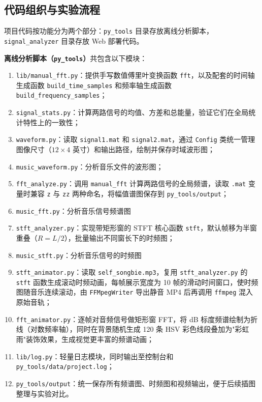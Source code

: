\documentclass[12pt,a4paper,UTF8]{ctexart}
\begin{document}
\subsection{代码组织与实验流程}
项目代码按功能分为两个部分：\texttt{py\_tools} 目录存放离线分析脚本，\texttt{signal\_analyzer} 目录存放 Web 部署代码。

\textbf{离线分析脚本（\texttt{py\_tools}）}共包含以下模块：
\begin{enumerate}
    \item \texttt{lib/manual\_fft.py}：提供手写数值傅里叶变换函数 \texttt{fft}，以及配套的时间轴生成函数 \texttt{build\_time\_samples} 和频率轴生成函数 \texttt{build\_frequency\_samples}；
    \item \texttt{signal\_stats.py}：计算两路信号的均值、方差和总能量，验证它们在全局统计特性上的一致性；
    \item \texttt{waveform.py}：读取 \texttt{signal1.mat} 和 \texttt{signal2.mat}，通过 \texttt{Config} 类统一管理图像尺寸（$12\times4$ 英寸）和输出路径，绘制并保存时域波形图；
    \item \texttt{music\_waveform.py}：分析音乐文件的波形图；
    \item \texttt{fft\_analyze.py}：调用 \texttt{manual\_fft} 计算两路信号的全局频谱，读取 \texttt{.mat} 变量时兼容 \texttt{z} 与 \texttt{zz} 两种命名，将幅值谱图保存到 \texttt{py\_tools/output}；
    \item \texttt{music\_fft.py}：分析音乐信号频谱图
    \item \texttt{stft\_analyzer.py}：实现带矩形窗的 STFT 核心函数 \texttt{stft}，默认帧移为半窗重叠（$R=L/2$），批量输出不同窗长下的时频图；
    \item \texttt{music\_stft.py}：分析音乐信号的时频图
    \item \texttt{stft\_animator.py}：读取 \texttt{self\_songbie.mp3}，复用 \texttt{stft\_analyzer.py} 的 \texttt{stft} 函数生成滚动时频动画，每帧展示宽度为 10 帧的滑动时间窗口，使时频图随音乐连续滚动，由 \texttt{FFMpegWriter} 导出静音 MP4 后再调用 \texttt{ffmpeg} 混入原始音轨；
    \item \texttt{fft\_animator.py}：逐帧对音频信号做矩形窗 FFT，将 dB 标度频谱绘制为折线（对数频率轴），同时在背景随机生成 120 条 HSV 彩色线段叠加为"彩虹雨"装饰效果，生成视觉更丰富的频谱动画；
    \item \texttt{lib/log.py}：轻量日志模块，同时输出至控制台和 \texttt{py\_tools/data/project.log}；
    \item \texttt{py\_tools/output}：统一保存所有频谱图、时频图和视频输出，便于后续插图整理与实验对比。
\end{enumerate}
\end{document}
